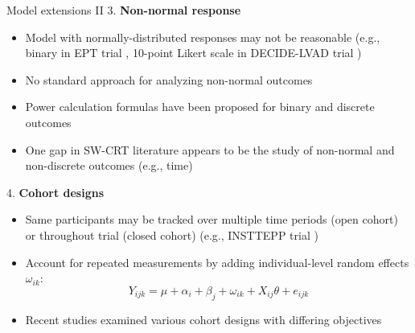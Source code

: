 \documentclass[9pt]{beamer}
\begin{document}
\begin{frame}{Model extensions II}
3. \textbf{Non-normal response}
\begin{itemize}

\item
Model with normally-distributed responses may not be reasonable (e.g., binary in EPT trial \citep{Hussey:2007}, 10-point Likert scale in DECIDE-LVAD trial \citep{Allen:2018})

\item
No standard approach for analyzing non-normal outcomes

\item
Power calculation formulas have been proposed for binary and discrete outcomes \citep{Wang:2021,Xia:2021}

\item
One gap in SW-CRT literature appears to be the study of non-normal and non-discrete outcomes (e.g., time)

\end{itemize}
\vspace{2em}

4. \textbf{Cohort designs}
\begin{itemize}

\item
Same participants may be tracked over multiple time periods (open cohort) or throughout trial (closed cohort) (e.g., INSTTEPP trial \citep{Nease:2018})

\item
Account for repeated measurements by adding individual-level random effects $\omega_{ik}$:
\[
Y_{ijk} = \mu + \alpha_i + \beta_j + \omega_{ik} + X_{ij}\theta + e_{ijk}
\]

\item
Recent studies \citep{Hooper:2019,Kasza:2020,Li:2020} examined various cohort designs with differing objectives

\end{itemize}
\end{frame}
\end{document}
